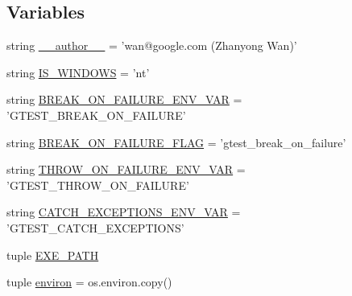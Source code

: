 \subsection*{\-Variables}
\begin{DoxyCompactItemize}
\item 
string \hyperlink{namespacegtest__break__on__failure__unittest_a629d61dfe4da763164a4d1a2d85b0afd}{\-\_\-\-\_\-author\-\_\-\-\_\-} = 'wan@google.\-com (\-Zhanyong \-Wan)'
\item 
string \hyperlink{namespacegtest__break__on__failure__unittest_ab1b21b880253abfa3ab3dfc19b06814c}{\-I\-S\-\_\-\-W\-I\-N\-D\-O\-W\-S} = 'nt'
\item 
string \hyperlink{namespacegtest__break__on__failure__unittest_a0f8ac0a1e414f3870fcb60f000f56dc6}{\-B\-R\-E\-A\-K\-\_\-\-O\-N\-\_\-\-F\-A\-I\-L\-U\-R\-E\-\_\-\-E\-N\-V\-\_\-\-V\-A\-R} = '\-G\-T\-E\-S\-T\-\_\-\-B\-R\-E\-A\-K\-\_\-\-O\-N\-\_\-\-F\-A\-I\-L\-U\-R\-E'
\item 
string \hyperlink{namespacegtest__break__on__failure__unittest_ad5756bb8068aa43fba10444f6af9a016}{\-B\-R\-E\-A\-K\-\_\-\-O\-N\-\_\-\-F\-A\-I\-L\-U\-R\-E\-\_\-\-F\-L\-A\-G} = 'gtest\-\_\-break\-\_\-on\-\_\-failure'
\item 
string \hyperlink{namespacegtest__break__on__failure__unittest_a39a8e367b7459bf652c080053c38ed5d}{\-T\-H\-R\-O\-W\-\_\-\-O\-N\-\_\-\-F\-A\-I\-L\-U\-R\-E\-\_\-\-E\-N\-V\-\_\-\-V\-A\-R} = '\-G\-T\-E\-S\-T\-\_\-\-T\-H\-R\-O\-W\-\_\-\-O\-N\-\_\-\-F\-A\-I\-L\-U\-R\-E'
\item 
string \hyperlink{namespacegtest__break__on__failure__unittest_ac036692b239626aaaa6cab22424b8c9c}{\-C\-A\-T\-C\-H\-\_\-\-E\-X\-C\-E\-P\-T\-I\-O\-N\-S\-\_\-\-E\-N\-V\-\_\-\-V\-A\-R} = '\-G\-T\-E\-S\-T\-\_\-\-C\-A\-T\-C\-H\-\_\-\-E\-X\-C\-E\-P\-T\-I\-O\-N\-S'
\item 
tuple \hyperlink{namespacegtest__break__on__failure__unittest_a216df3f485400b109390103528720888}{\-E\-X\-E\-\_\-\-P\-A\-T\-H}
\item 
tuple \hyperlink{namespacegtest__break__on__failure__unittest_a199b463c0623b1b68e7b45e7b01fe16c}{environ} = os.\-environ.\-copy()
\end{DoxyCompactItemize}


